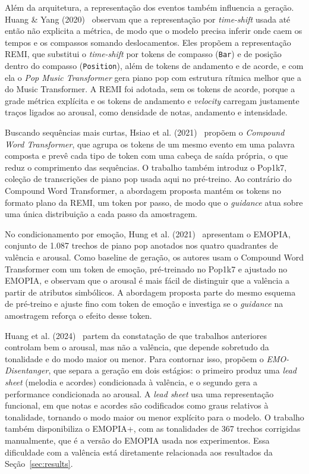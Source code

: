 \documentclass{article}
\begin{document}
Além da arquitetura, a representação dos eventos também influencia a geração.
Huang \& Yang (2020)~\cite{Huang2020:remi} observam que a representação por
\emph{time-shift} usada até então não explicita a métrica, de modo que o modelo
precisa inferir onde caem os tempos e os compassos somando deslocamentos. Eles
propõem a representação REMI, que substitui o \emph{time-shift} por tokens de
compasso (\texttt{Bar}) e de posição dentro do compasso (\texttt{Position}),
além de tokens de andamento e de acorde, e com ela o
\emph{Pop Music Transformer} gera piano pop com estrutura rítmica melhor que a
do Music Transformer. A REMI foi adotada, sem os tokens de acorde, porque a
grade métrica explícita e os tokens de andamento e \emph{velocity} carregam
justamente traços ligados ao arousal, como densidade de notas, andamento e
intensidade.

Buscando sequências mais curtas, Hsiao et al. (2021)~\cite{Hsiao2021:cp} propõem
o \emph{Compound Word Transformer}, que agrupa os tokens de um mesmo evento em
uma palavra composta e prevê cada tipo de token com uma cabeça de saída própria,
o que reduz o comprimento das sequências. O trabalho também introduz o Pop1k7,
coleção de transcrições de piano pop usada aqui no pré-treino. Ao contrário do
Compound Word Transformer, a abordagem proposta mantém os tokens no formato
plano da REMI, um token por passo, de modo que o \emph{guidance} atua sobre uma
única distribuição a cada passo da amostragem.

No condicionamento por emoção, Hung et al. (2021)~\cite{Hung2021:emopia}
apresentam o EMOPIA, conjunto de 1.087 trechos de piano pop anotados nos quatro
quadrantes de valência e arousal. Como baseline de geração, os autores usam o
Compound Word Transformer com um token de emoção, pré-treinado no Pop1k7 e
ajustado no EMOPIA, e observam que o arousal é mais fácil de distinguir que a
valência a partir de atributos simbólicos. A abordagem proposta parte do mesmo
esquema de pré-treino e ajuste fino com token de emoção e investiga se o
\emph{guidance} na amostragem reforça o efeito desse token.

Huang et al. (2024)~\cite{Huang2024:emodisentanger} partem da constatação de que
trabalhos anteriores controlam bem o arousal, mas não a valência, que depende
sobretudo da tonalidade e do modo maior ou menor. Para contornar isso, propõem o
\emph{EMO-Disentanger}, que separa a geração em dois estágios: o primeiro produz
uma \emph{lead sheet} (melodia e acordes) condicionada à valência, e o segundo
gera a performance condicionada ao arousal. A \emph{lead sheet} usa uma
representação funcional, em que notas e acordes são codificados como graus
relativos à tonalidade, tornando o modo maior ou menor explícito para o modelo.
O trabalho também disponibiliza o EMOPIA+, com as tonalidades de 367 trechos
corrigidas manualmente, que é a versão do EMOPIA usada nos experimentos. Essa
dificuldade com a valência está diretamente relacionada aos resultados da
Seção~\ref{sec:results}.
\end{document}
